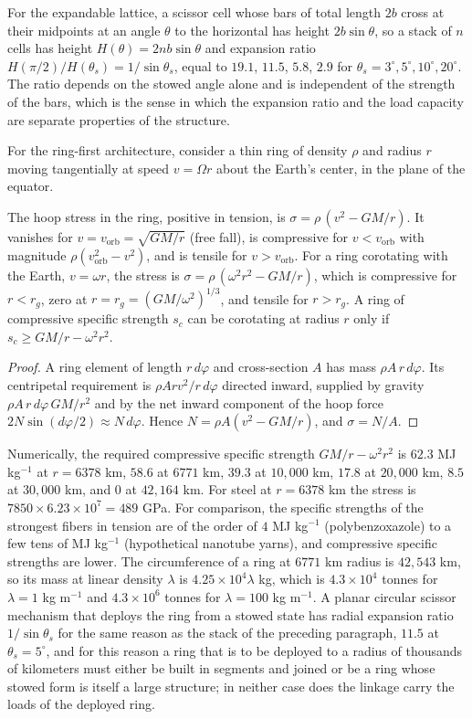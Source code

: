 For the expandable lattice, a scissor cell whose bars of total length $2b$ cross at their midpoints at an angle $\theta$ to the horizontal has height $2b\sin\theta$, so a stack of $n$ cells has height $H(\theta)=2nb\sin\theta$ and expansion ratio $H(\pi/2)/H(\theta_s)=1/\sin\theta_s$, equal to $19.1$, $11.5$, $5.8$, $2.9$ for $\theta_s=3^\circ,5^\circ,10^\circ,20^\circ$. The ratio depends on the stowed angle alone and is independent of the strength of the bars, which is the sense in which the expansion ratio and the load capacity are separate properties of the structure.

For the ring-first architecture, consider a thin ring of density $\rho$ and radius $r$ moving tangentially at speed $v=\Omega r$ about the Earth's center, in the plane of the equator.

\begin{proposition}
The hoop stress in the ring, positive in tension, is $\sigma=\rho\,(v^2-GM/r)$. It vanishes for $v=v_{\mathrm{orb}}=\sqrt{GM/r}$ (free fall), is compressive for $v<v_{\mathrm{orb}}$ with magnitude $\rho(v_{\mathrm{orb}}^2-v^2)$, and is tensile for $v>v_{\mathrm{orb}}$. For a ring corotating with the Earth, $v=\omega r$, the stress is $\sigma=\rho\,(\omega^2r^2-GM/r)$, which is compressive for $r<r_g$, zero at $r=r_g=(GM/\omega^2)^{1/3}$, and tensile for $r>r_g$. A ring of compressive specific strength $s_c$ can be corotating at radius $r$ only if $s_c\ge GM/r-\omega^2r^2$.
\end{proposition}

\begin{proof}
A ring element of length $r\,d\varphi$ and cross-section $A$ has mass $\rho A\,r\,d\varphi$. Its centripetal requirement is $\rho Arv^2/r\,d\varphi$ directed inward, supplied by gravity $\rho A\,r\,d\varphi\,GM/r^2$ and by the net inward component of the hoop force $2N\sin(d\varphi/2)\approx N\,d\varphi$. Hence $N=\rho A(v^2-GM/r)$, and $\sigma=N/A$.
\end{proof}

Numerically, the required compressive specific strength $GM/r-\omega^2r^2$ is $62.3$ MJ kg$^{-1}$ at $r=6378$ km, $58.6$ at $6771$ km, $39.3$ at $10{,}000$ km, $17.8$ at $20{,}000$ km, $8.5$ at $30{,}000$ km, and $0$ at $42{,}164$ km. For steel at $r=6378$ km the stress is $7850\times6.23\times10^7=489$ GPa. For comparison, the specific strengths of the strongest fibers in tension are of the order of $4$ MJ kg$^{-1}$ (polybenzoxazole) to a few tens of MJ kg$^{-1}$ (hypothetical nanotube yarns), and compressive specific strengths are lower. The circumference of a ring at $6771$ km radius is $42{,}543$ km, so its mass at linear density $\lambda$ is $4.25\times10^{4}\lambda$ kg, which is $4.3\times10^{4}$ tonnes for $\lambda=1$ kg m$^{-1}$ and $4.3\times10^{6}$ tonnes for $\lambda=100$ kg m$^{-1}$. A planar circular scissor mechanism that deploys the ring from a stowed state has radial expansion ratio $1/\sin\theta_s$ for the same reason as the stack of the preceding paragraph, $11.5$ at $\theta_s=5^\circ$, and for this reason a ring that is to be deployed to a radius of thousands of kilometers must either be built in segments and joined or be a ring whose stowed form is itself a large structure; in neither case does the linkage carry the loads of the deployed ring.
